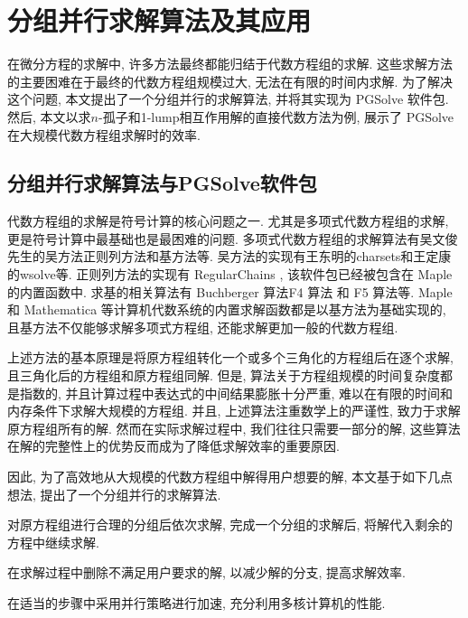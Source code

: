 \chapter{分组并行求解算法及其应用}\label{ch03}
在微分方程的求解中, 许多方法最终都能归结于代数方程组的求解. 这些求解方法的主要困难在于最终的代数方程组规模过大, 无法在有限的时间内求解. 为了解决这个问题, 本文提出了一个分组并行的求解算法, 并将其实现为 PGSolve 软件包. 然后, 本文以求$n$-孤子和1-lump相互作用解的直接代数方法为例, 展示了 PGSolve 在大规模代数方程组求解时的效率. 

\section{分组并行求解算法与PGSolve软件包}
代数方程组的求解是符号计算的核心问题之一. 尤其是多项式代数方程组的求解, 更是符号计算中最基础也是最困难的问题. 多项式代数方程组的求解算法有吴文俊先生的吴方法\cite{wu1984,wu1985}\D 正则列方法\cite{kalkbrener1991three,lu1994searching}和\Grobner{}基方法\cite{adams1994introduction}等. 吴方法的实现有王东明的charsets\cite{wang1995implementation}和王定康的wsolve\cite{wsolve}等. 正则列方法的实现有 RegularChains \cite{maza2000triangular}, 该软件包已经被包含在 Maple 的内置函数中. 求\Grobner{}基的相关算法有 Buchberger 算法\cite{buchberger1970algorithmic}\D F4 算法\cite{faugere1999new} 和 F5 算法\cite{faugere2002new}等. Maple 和 Mathematica 等计算机代数系统的内置求解函数都是以\Grobner{}基方法为基础实现的, 且\Grobner{}基方法不仅能够求解多项式方程组, 还能求解更加一般的代数方程组. 

上述方法的基本原理是将原方程组转化一个或多个三角化的方程组后在逐个求解, 且三角化后的方程组和原方程组同解. 但是, 算法关于方程组规模的时间复杂度都是指数的, 并且计算过程中表达式的中间结果膨胀十分严重, 难以在有限的时间和内存条件下求解大规模的方程组. 并且, 上述算法注重数学上的严谨性, 致力于求解原方程组所有的解. 然而在实际求解过程中, 我们往往只需要一部分的解, 这些算法在解的完整性上的优势反而成为了降低求解效率的重要原因. 

因此, 为了高效地从大规模的代数方程组中解得用户想要的解, 本文基于如下几点想法, 提出了一个分组并行的求解算法.
\begin{compactenum}[(1)]
\item 对原方程组进行合理的分组后依次求解, 完成一个分组的求解后, 将解代入剩余的方程中继续求解. 
\item 在求解过程中删除不满足用户要求的解, 以减少解的分支, 提高求解效率.
\item 在适当的步骤中采用并行策略进行加速, 充分利用多核计算机的性能.
\end{compactenum}

